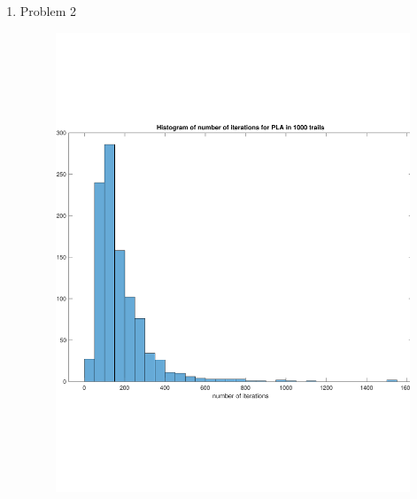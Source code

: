 \documentclass[12pt]{article}
\begin{document}
\begin{enumerate}
\begin{enumerate}
\begin{proof}
    by extract t to one side we have:
    \begin{equation*}
      t \leq \frac{R^2(w^T(t)w^*)^2}{\rho^2\left\| w(t)\right\|^2} = \frac{R^2}{\rho^2}\cdot\frac{(w^T(t)w^*)^2}{\left\| w(t)\right\|^2 \left\|w^*\right\|^2}\cdot \left\|w^*\right\|^2
    \end{equation*}
    Because: \begin{equation*}
               \frac{(w^T(t)w^*)^2}{\left\| w(t)\right\|^2 \left\|w^*\right\|^2} = cos(\theta)^2 \leq 1
             \end{equation*}
    We get that:
    \begin{equation*}
      t \leq \frac{R^2\left\| w^* \right\|^2}{\rho^2}
    \end{equation*}
   \end{proof}
    \end{enumerate}

 \item Problem 2  

  \begin{figure}[H]
   \centering
    \includegraphics[width=6in]{prob2-1.pdf}
  \end{figure}
  

\end{enumerate}
\end{document}
